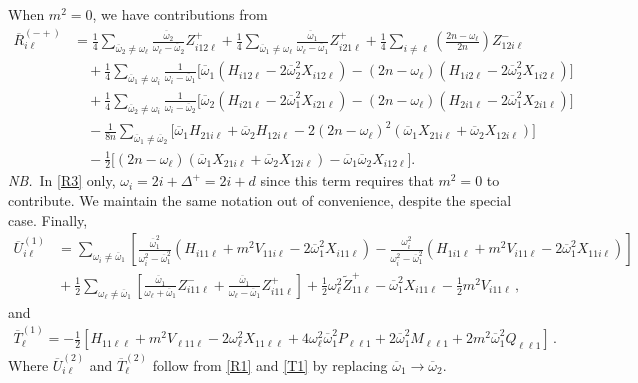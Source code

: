 \documentclass[letterpaper,11pt]{article}
\newcommand{\oi}{\omega_i}
\newcommand{\ol}{\omega_\ell}
\newcommand{\oone}{\overline{\omega}_1}
\newcommand{\otwo}{\overline{\omega}_2}
\begin{document}
When $m^2 = 0$, we have contributions from
\begin{align}
\label{R3}
\overline{R}_{i\ell}^{(-+)} &=  \frac{1}{4} \sum_{\otwo \neq \ol} \frac{\otwo}{\ol - \otwo} Z^+_{i12\ell} + \frac{1}{4} \sum_{\oone \neq \ol} \frac{\oone}{\ol - \oone} Z^+_{i21\ell} + \frac{1}{4} \sum_{i \neq \ell} \left( \frac{2n - \ol}{2n} \right) Z^-_{12i\ell} \nonumber \\
%
& \quad + \frac{1}{4} \sum_{\oone \neq \oi} \frac{1}{\oi - \oone} \Big[ \oone \left( H_{i12\ell} - 2\otwo^2 X_{i12\ell} \right) - (2n - \ol) \left( H_{1i2\ell} - 2\otwo^2 X_{1i2\ell} \right) \Big] \nonumber \\
%
& \quad + \frac{1}{4} \sum_{\otwo \neq \oi} \frac{1}{\oi - \otwo} \Big[ \otwo \left( H_{i21\ell} - 2\oone^2 X_{i21\ell} \right) - (2n - \ol) \left( H_{2i1\ell} - 2\oone^2 X_{2i1\ell} \right) \Big] \nonumber \\
%
& \quad - \frac{1}{8n} \sum_{\oone \neq \otwo} \Big[ \oone H_{21i\ell} + \otwo H_{12i\ell} - 2 \left( 2n - \ol \right)^2 \left(\oone X_{21i\ell} + \otwo X_{12i\ell} \right) \Big] \nonumber \\
%
& \quad - \frac{1}{2} \Big[ (2n - \ol) \left( \oone X_{21i\ell} + \otwo X_{12i\ell} \right) - \oone \otwo X_{i12\ell} \Big] .
\end{align}
{\it NB.}\, In \eqref{R3} only, $\oi = 2i + \Delta^+ = 2i + d$ since this term requires that $m^2 = 0$ to contribute. We maintain the same notation out of convenience, despite the special case. Finally, 
\begin{align}
\label{R1}
\overline{U}^{(1)}_{i\ell} &= \sum_{\oi \neq \oone} \left[ \frac{\oone^2}{\oi^2 - \oone^2} \left( H_{i11\ell} + m^2 V_{11i\ell} -2\oone^2 X_{i11\ell} \right) - \frac{\oi^2}{\oi^2 - \oone^2} \left( H_{1i1\ell} +m^2 V_{i11\ell} -2\oone^2 X_{11i\ell} \right) \right] \nonumber \\
%
& \!\!\!\! + \frac{1}{2} \sum_{\ol \neq \oone} \left[ \frac{\oone}{\ol + \oone} Z^-_{i11\ell} + \frac{\oone}{\ol - \oone}Z^+_{i11\ell} \right] + \frac{1}{2} \ol^2 \tilde{Z}^+_{11\ell} - \oone^2 X_{i11\ell} - \frac{1}{2}m^2 V_{i11\ell}  \, ,
\end{align}
and
\begin{align}
	\label{T1}
	\overline{T}^{(1)}_\ell = -\frac{1}{2} \left[ H_{11\ell\ell} + m^2 V_{\ell 11\ell} - 2\ol^2 X_{11\ell\ell} +4 \ol^2 \oone^2 P_{\ell\ell 1} + 2\oone^2 M_{\ell\ell 1} + 2m^2 \oone^2 Q_{\ell\ell 1} \right] \, .
\end{align}
Where $\overline{U}^{(2)}_{i\ell}$ and $\overline{T}^{(2)}_{\ell}$ follow from \eqref{R1} and \eqref{T1} by replacing $\oone \to \otwo$.
\end{document}
